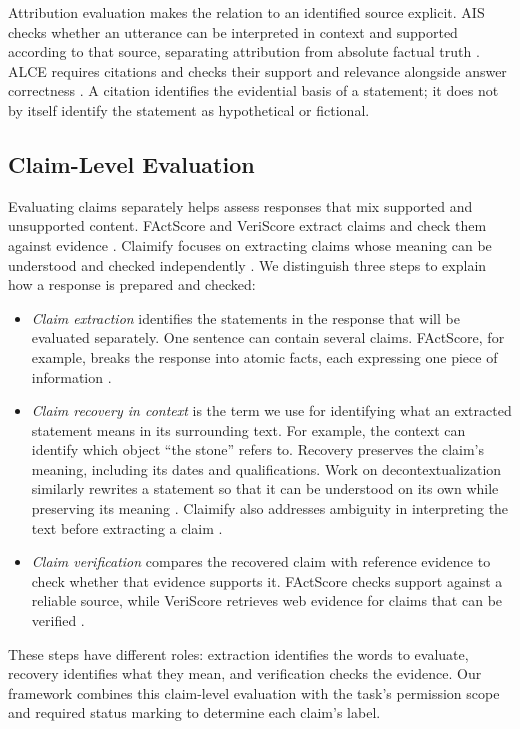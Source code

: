 \documentclass{clv2025}
\begin{document}
Attribution evaluation makes the relation to an identified source explicit.
AIS checks whether an utterance can be interpreted in context and supported
according to that source, separating attribution from absolute factual truth
\citep{rashkin_ais_2023}. ALCE requires citations and checks their support
and relevance alongside answer correctness \citep{gao_alce_2023}.
A citation identifies the evidential basis of a statement; it does not by
itself identify the statement as hypothetical or fictional.

\subsection{Claim-Level Evaluation}\label{subsec:extraction}

Evaluating claims separately helps assess responses that mix supported and
unsupported content.
FActScore and VeriScore extract claims and check them against evidence
\citep{min_factscore_2023,song_veriscore_2024}. Claimify focuses on extracting
claims whose meaning can be understood and checked independently
\citep{metropolitansky_claimify_2025}.
We distinguish three steps to explain how a response is prepared and checked:
\begin{itemize}
\item \emph{Claim extraction} identifies the statements in the response
that will be evaluated separately. One sentence can contain several claims.
FActScore, for example, breaks the response into atomic facts, each expressing
one piece of information \citep{min_factscore_2023}.
\item \emph{Claim recovery in context} is the term we use for identifying
what an extracted statement means in its surrounding text. For example,
the context can identify which object ``the stone'' refers to. Recovery
preserves the claim's meaning, including its dates and qualifications.
Work on decontextualization similarly rewrites a statement so that it can
be understood on its own while preserving its meaning
\citep{choi_decontextualization_2021}. Claimify also addresses ambiguity in
interpreting the text before extracting a claim
\citep{metropolitansky_claimify_2025}.
\item \emph{Claim verification} compares the recovered claim with
reference evidence to check whether that evidence supports it. FActScore
checks support against a reliable source, while VeriScore retrieves web
evidence for claims that can be verified
\citep{min_factscore_2023,song_veriscore_2024}.
\end{itemize}
These steps have different roles: extraction identifies the words to
evaluate, recovery identifies what they mean, and verification checks
the evidence. Our framework combines this claim-level evaluation with
the task's permission scope and required status marking to determine
each claim's label.
\end{document}
